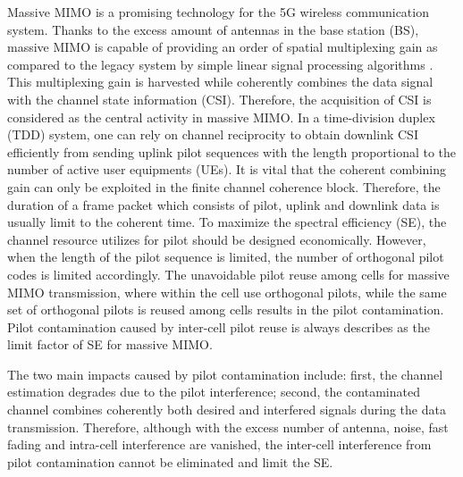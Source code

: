 Massive MIMO is a promising technology for the 5G wireless communication system. Thanks to the excess amount of antennas in the base station (BS), massive MIMO is capable of providing an order of spatial multiplexing gain as compared to the legacy system by simple linear signal processing algorithms \cite{marzetta2010noncooperative}. 
This multiplexing gain is harvested while coherently combines the data signal with the channel state information (CSI). Therefore, the acquisition of CSI is considered as the central activity in massive MIMO. In a time-division duplex (TDD) system, one can rely on channel reciprocity to obtain downlink CSI efficiently from sending uplink pilot sequences with the length proportional to the number of active user equipments (UEs). It is vital that the coherent combining gain can only be exploited in the finite channel coherence block. Therefore, the duration of a frame packet which consists of pilot, uplink and downlink data is usually limit to the coherent time. To maximize the spectral efficiency (SE), the channel resource utilizes for pilot should be designed economically. However, when the length of the pilot sequence is limited, the number of orthogonal pilot codes is limited accordingly. The unavoidable pilot reuse among cells for massive MIMO transmission, where within the cell use orthogonal pilots,
while the same set of orthogonal pilots is reused among cells results in the pilot contamination. Pilot contamination caused by inter-cell pilot reuse is always describes as the limit factor of SE for massive MIMO\cite{marzetta2010noncooperative,jose2011pilot}. 

The two main impacts caused by pilot contamination include: first, the channel estimation degrades due to the pilot interference; second, the contaminated channel combines coherently both desired and interfered signals during the data transmission. Therefore, although with the excess number of antenna, noise, fast fading and intra-cell interference are vanished, the inter-cell interference from pilot contamination cannot be eliminated and limit the SE\cite{marzetta2010noncooperative,bjornson2017massive}. 

